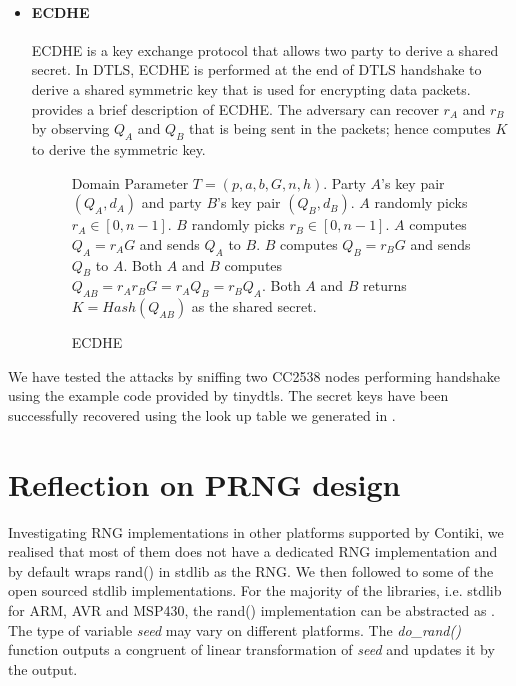 \begin{itemize}
\item \paragraph{\textbf{ECDHE}}
	ECDHE is a key exchange protocol that allows two party to derive a shared secret. In DTLS, ECDHE is performed at the end of DTLS handshake to derive a shared symmetric key that is used for encrypting data packets.  provides a brief description of ECDHE. The adversary can recover $r_A$ and $r_B$ by observing $Q_A$ and $Q_B$ that is being sent in the packets; hence computes $K$ to derive the symmetric key.
	\begin{figure}
		\begin{algorithmic}[1]
		\scriptsize
		\REQUIRE Domain Parameter $T = (p, a, b, G, n, h)$. Party $A$'s key pair $(Q_A, d_A)$ and party $B$'s key pair $(Q_B, d_B)$. 
		\STATE $A$ randomly picks $r_A \in [0, n-1]$. 
		\STATE $B$ randomly picks $r_B \in [0, n-1]$.
		\STATE $A$ computes $Q_A = {r_A}G$ and sends $Q_A$ to $B$.
		\STATE $B$ computes $Q_B = {r_B}G$ and sends $Q_B$ to $A$.
		\STATE Both $A$ and $B$ computes $Q_{AB} = {r_A}{r_B}G = {r_A}{Q_B} = {r_B}{Q_A}$.
		\RETURN Both $A$ and $B$ returns $K = Hash(Q_{AB})$ as the shared secret.
		\end{algorithmic}
		\caption{ECDHE}
		\label{ECDHE}
	\end{figure}
\end{itemize}

We have tested the attacks by sniffing two CC2538 nodes performing handshake using the example code provided by tinydtls. The secret keys have been successfully recovered using the look up table we generated in \cite{prngtest}.

\section{Reflection on PRNG design}\label{PRNGReflection}
Investigating RNG implementations in other platforms supported by Contiki, we realised that most of them does not have a dedicated RNG implementation and by default wraps rand() in stdlib as the RNG. We then followed to some of the open sourced stdlib implementations. For the majority of the libraries, i.e. stdlib for ARM\cite{ARMrand}, AVR\cite{AVRrand} and MSP430\cite{MSP430rand}, the rand() implementation can be abstracted as . The type of variable \textit{seed}  may vary on different platforms. The \textit{do\_rand()} function outputs a congruent of linear transformation of \textit{seed} and updates it by the output.
 
